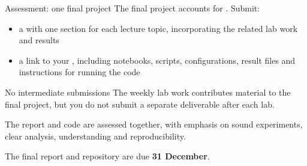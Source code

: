 \documentclass[aspectratio=169,10pt]{beamer}
\begin{document}
\begin{frame}{Assessment: one final project}
  The final project accounts for . Submit:
  \begin{itemize}
    \item a  with one section for each lecture topic,
          incorporating the related lab work and results
    \item a link to your , including notebooks, scripts,
          configurations, result files and instructions for running the code
  \end{itemize}

  \vfill
  \begin{block}{No intermediate submissions}
    The weekly lab work contributes material to the final project, but you do
    not submit a separate deliverable after each lab.
  \end{block}

  \vfill
  The report and code are assessed together, with emphasis on sound
  experiments, clear analysis, understanding and reproducibility.
  \vspace{0.3em}

  The final report and repository are due \textbf{31 December}.
\end{frame}
\end{document}
